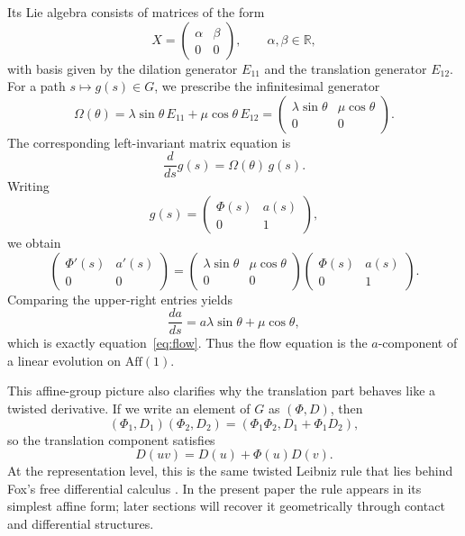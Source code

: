 Its Lie algebra consists of matrices of the form
\[
X=
\begin{pmatrix}
\alpha & \beta\\
0 & 0
\end{pmatrix},
\qquad \alpha,\beta\in\mathbb{R},
\]
with basis given by the dilation generator $E_{11}$ and the translation generator $E_{12}$. For a path $s\mapsto g(s)\in G$, we prescribe the infinitesimal generator
\[
\Omega(\theta)
= \lambda \sin\theta\,E_{11} + \mu\cos\theta\,E_{12}
=
\begin{pmatrix}
\lambda\sin\theta & \mu\cos\theta\\
0 & 0
\end{pmatrix}.
\]
The corresponding left-invariant matrix equation is
\begin{equation}
    \frac{d}{ds}g(s)=\Omega(\theta)\,g(s).
\end{equation}
Writing
\[
g(s)=
\begin{pmatrix}
\Phi(s) & a(s)\\
0 & 1
\end{pmatrix},
\]
we obtain
\[
\begin{pmatrix}
\Phi'(s) & a'(s)\\
0 & 0
\end{pmatrix}
=
\begin{pmatrix}
\lambda\sin\theta & \mu\cos\theta\\
0 & 0
\end{pmatrix}
\begin{pmatrix}
\Phi(s) & a(s)\\
0 & 1
\end{pmatrix}.
\]
Comparing the upper-right entries yields
\[
    \frac{da}{ds}=a\lambda\sin\theta + \mu\cos\theta,
\]
which is exactly equation~\eqref{eq:flow}. Thus the flow equation is the $a$-component of a linear evolution on $\mathrm{Aff}(1)$.

This affine-group picture also clarifies why the translation part behaves like a twisted derivative. If we write an element of $G$ as $(\Phi,D)$, then
\[
(\Phi_1,D_1)(\Phi_2,D_2)=(\Phi_1\Phi_2, D_1+\Phi_1D_2),
\]
so the translation component satisfies
\begin{equation}
    D(uv)=D(u)+\Phi(u)D(v).
\end{equation}
At the representation level, this is the same twisted Leibniz rule that lies behind Fox's free differential calculus \cite{Fox1953FreeDifferential}. In the present paper the rule appears in its simplest affine form; later sections will recover it geometrically through contact and differential structures.

